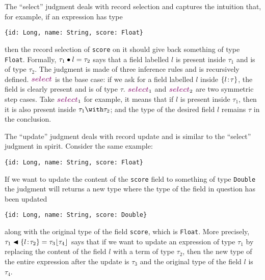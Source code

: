 The ``select'' judgment deals with record selection and captures the intuition
that, for example, if an expression has type
\begin{lstlisting}
{id: Long, name: String, score: Float}
\end{lstlisting}
then the record selection of \lstinline$score$ on it should give back something
of type \lstinline$Float$. Formally, $\tau_1 \bullet l = \tau_2$ says that a
field labelled $l$ is present inside $\tau_1$ and is of type $\tau_2$. The
judgment is made of three inference rules and is recursively defined.
$\rulelabelselect$ is the base case: if we ask for a field labelled $l$ inside
$\{ l \!:\! \tau \}$, the field is clearly present and is of type $\tau$.
$\rulelabelselectleft$ and $\rulelabelselectright$ are two symmetric step cases. Take
$\rulelabelselectleft$ for example, it means that if $l$ is present inside
$\tau_1$, then it is also present inside $\tau_1 \andop \tau_2$; and the type of
the desired field $l$ remains $\tau$ in the conclusion.

The ``update'' judgment deals with record update and is similar to the ``select''
judgment in spirit. Consider the same example:
\begin{lstlisting}
{id: Long, name: String, score: Float}
\end{lstlisting}
If we want to update the content of the \lstinline$score$ field to something of
type \lstinline$Double$ the judgment will returns a new type where the type of
the field in question has been updated
\begin{lstlisting}
{id: Long, name: String, score: Double}
\end{lstlisting}
along with the original type of the field \lstinline$score$, which is
\lstinline$Float$. More precisely,
$\tau_1 \blacktriangleleft \{ l \!:\! \tau_2 \} = \tau_3 \lfloor \tau_4 \rfloor$ says that if we want to update
an expression of type $\tau_1$ by replacing the content of the field $l$ with a
term of type $\tau_2$, then the new type of the entire expression after the
update is $\tau_3$ and the original type of the field $l$ is $\tau_4$.



